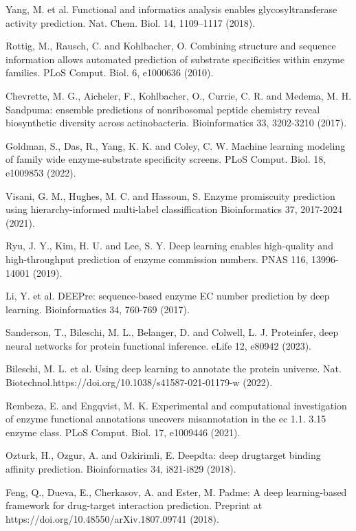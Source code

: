 \documentclass[12pt]{article}
\begin{document}
\begin{thebibliography}{20}
 Yang, M. et al. Functional and informatics analysis enables glycosyltransferase activity prediction. Nat. Chem. Biol. 14, 1109–1117 (2018).

 Rottig, M., Rausch, C. and Kohlbacher, O. Combining structure and sequence information allows automated prediction of substrate specificities within enzyme families. PLoS Comput. Biol. 6, e1000636 (2010).

 Chevrette, M. G., Aicheler, F., Kohlbacher, O., Currie, C. R. and Medema, M. H. Sandpuma: ensemble predictions of nonribosomal peptide chemistry reveal biosynthetic diversity across actinobacteria. Bioinformatics 33, 3202-3210 (2017).

 Goldman, S., Das, R., Yang, K. K. and Coley, C. W. Machine learning modeling of family wide enzyme-substrate specificity screens. PLoS Comput. Biol. 18, e1009853 (2022).

 Visani, G. M., Hughes, M. C. and Hassoun, S. Enzyme promiscuity prediction using hierarchy-informed multi-label classiffication Bioinformatics 37, 2017-2024 (2021).

 Ryu, J. Y., Kim, H. U. and Lee, S. Y. Deep learning enables high-quality and high-throughput prediction of enzyme commission numbers. PNAS 116, 13996-14001 (2019).

 Li, Y. et al. DEEPre: sequence-based enzyme EC number prediction by deep learning. Bioinformatics 34, 760-769 (2017).

 Sanderson, T., Bileschi, M. L., Belanger, D. and Colwell, L. J. Proteinfer, deep neural networks for protein functional inference. eLife 12, e80942 (2023).

 Bileschi, M. L. et al. Using deep learning to annotate the protein universe. Nat. Biotechnol.https://doi.org/10.1038/s41587-021-01179-w (2022).

 Rembeza, E. and Engqvist, M. K. Experimental and computational investigation of enzyme functional annotations uncovers misannotation in the ec 1.1. 3.15 enzyme class. PLoS Comput. Biol. 17, e1009446 (2021).

 Ozturk, H., Ozgur, A. and Ozkirimli, E. Deepdta: deep drugtarget binding affinity prediction. Bioinformatics 34, i821-i829 (2018).

 Feng, Q., Dueva, E., Cherkasov, A. and Ester, M. Padme: A deep learning-based framework for drug-target interaction prediction. Preprint at https://doi.org/10.48550/arXiv.1807.09741 (2018).


\end{thebibliography}
\end{document}
